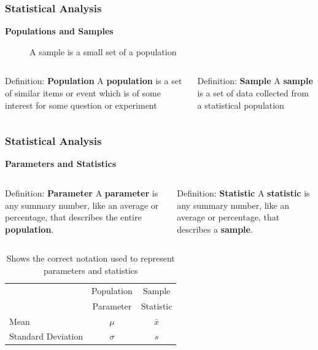 \documentclass{beamer}
\begin{document}
\begin{frame}
\frametitle{Statistical Analysis}
\textbf{Populations and Samples}
\vspace{0.2cm}
\begin{figure}
\caption{A sample is a small set of a population}
\end{figure}
\vspace{-1cm}
\begin{columns}[t]
\begin{block}{Definition: \textbf{Population}}
A \textbf{population} is a set of similar items or event which is of some interest for some question or experiment
\end{block}
\begin{block}{Definition: \textbf{Sample}}
A \textbf{sample} is a set of data collected from a statistical population
\end{block}
\end{columns}
\end{frame}

\begin{frame}
\frametitle{Statistical Analysis}
\textbf{Parameters and Statistics}
\begin{columns}[t]
\begin{block}{Definition: \textbf{Parameter}}
A \textbf{parameter} is any summary number, like an average or percentage, that describes the entire \textbf{population}.
\end{block}
\begin{block}{Definition: \textbf{Statistic}}
A \textbf{statistic} is any summary number, like an average or percentage, that describes a \textbf{sample}.
\end{block}
\end{columns}
\begin{table}
\caption{Shows the correct notation used to represent parameters and statistics}
\begin{tabular}{l c c }
\toprule
 & Population & Sample\\
 & Parameter & Statistic\\
 \midrule
 Mean & $\mu$ & $\bar{x}$\\
 Standard Deviation & $\sigma$ & $s$\\
 \bottomrule
\end{tabular}
\end{table}
\end{frame}
\end{document}
